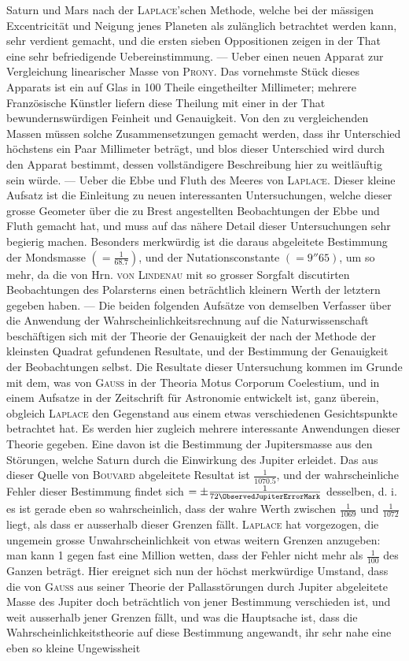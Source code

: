 Saturn und Mars nach der \textsc{Laplace}'schen Methode, welche bei der mässigen Excentricität und Neigung jenes Planeten als zulänglich betrachtet werden kann, sehr verdient gemacht, und die ersten sieben Oppositionen zeigen in der That eine sehr befriedigende Uebereinstimmung. --- Ueber einen neuen Apparat zur Vergleichung linearischer Masse von \textsc{Prony}. Das vornehmste Stück dieses Apparats ist ein auf Glas in 100 Theile eingetheilter Millimeter; mehrere Französische Künstler liefern diese Theilung mit einer in der That bewundernswürdigen Feinheit und Genauigkeit. Von den zu vergleichenden Massen müssen solche Zusammensetzungen gemacht werden, dass ihr Unterschied höchstens ein Paar Millimeter beträgt, und blos dieser Unterschied wird durch den Apparat bestimmt, dessen vollständigere Beschreibung hier zu weitläuftig sein würde. --- Ueber die Ebbe und Fluth des Meeres von \textsc{Laplace}. Dieser kleine Aufsatz ist die Einleitung zu neuen interessanten Untersuchungen, welche dieser grosse Geometer über die zu Brest angestellten Beobachtungen der Ebbe und Fluth gemacht hat, und muss auf das nähere Detail dieser Untersuchungen sehr begierig machen. Besonders merkwürdig ist die daraus abgeleitete Bestimmung der Mondsmasse $(= \frac{1}{68.7})$, und der Nutationsconstante $(= 9''65)$, um so mehr, da die von Hrn. \textsc{von Lindenau} mit so grosser Sorgfalt discutirten Beobachtungen des Polarsterns einen beträchtlich kleinern Werth der letztern gegeben haben. --- Die beiden folgenden Aufsätze von demselben Verfasser über die Anwendung der Wahrscheinlichkeitsrechnung auf die Naturwissenschaft beschäftigen sich mit der Theorie der Genauigkeit der nach der Methode der kleinsten Quadrat gefundenen Resultate, und der Bestimmung der Genauigkeit der Beobachtungen selbst. Die Resultate dieser Untersuchung kommen im Grunde mit dem, was von \textsc{Gauss} in der Theoria Motus Corporum Coelestium, und in einem Aufsatze in der Zeitschrift für Astronomie entwickelt ist, ganz überein, obgleich \textsc{Laplace} den Gegenstand aus einem etwas verschiedenen Gesichtspunkte betrachtet hat. Es werden hier zugleich mehrere interessante Anwendungen dieser Theorie gegeben. Eine davon ist die Bestimmung der Jupitersmasse aus den Störungen, welche Saturn durch die Einwirkung des Jupiter erleidet. Das aus dieser Quelle von \textsc{Bouvard} abgeleitete Resultat ist $\frac{1}{1070.5}$, und der wahrscheinliche Fehler dieser Bestimmung findet sich $= \pm \frac{1}{72\ObservedJupiterErrorMark}$ desselben, d. i. es ist gerade eben so wahrscheinlich, dass der wahre Werth zwischen $\frac{1}{1069}$ und $\frac{1}{1072}$ liegt, als dass er ausserhalb dieser Grenzen fällt. \textsc{Laplace} hat vorgezogen, die ungemein grosse Unwahrscheinlichkeit von etwas weitern Grenzen anzugeben: man kann 1 gegen fast eine Million wetten, dass der Fehler nicht mehr als $\frac{1}{100}$ des Ganzen beträgt. Hier ereignet sich nun der höchst merkwürdige Umstand, dass die von \textsc{Gauss} aus seiner Theorie der Pallasstörungen durch Jupiter abgeleitete Masse des Jupiter doch beträchtlich von jener Bestimmung verschieden ist, und weit ausserhalb jener Grenzen fällt, und was die Hauptsache ist, dass die Wahrscheinlichkeitstheorie auf diese Bestimmung angewandt, ihr sehr nahe eine eben so kleine Ungewissheit 